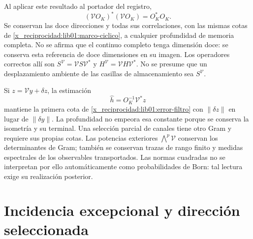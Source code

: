 Al aplicar este resultado al portador del registro,
\begin{equation}
 (\mathcal VO_K)^*(\mathcal VO_K)=O_K^*O_K.
 \label{x_reciprocidad:lib01:gram-memoria}
\end{equation}
Se conservan las doce direcciones y todas sus correlaciones, con las
mismas cotas de \cref{x_reciprocidad:lib01:marco-ciclico}, a cualquier profundidad de
memoria completa. No se afirma que el continuo completo tenga dimensión
doce: se conserva esta referencia de doce dimensiones en su imagen.
Los operadores correctos allí son
\(S^{\mathcal V}=\mathcal VS\mathcal V^*\) y
\(H^{\mathcal V}=\mathcal VH\mathcal V^*\). No se presume que un
desplazamiento ambiente de las casillas de almacenamiento sea
\(S^{\mathcal V}\).

Si \(z=\mathcal Vy+\delta z\), la estimación
\[
 \widehat h=O_K^{-1}\mathcal V^*z
\]
mantiene la primera cota de \eqref{x_reciprocidad:lib01:error-filtro} con
\(\|\delta z\|\) en lugar de \(\|\delta y\|\). La profundidad
no empeora esa constante porque se conserva la isometría y su terminal.
Una selección parcial de canales tiene otro Gram y requiere sus propias
cotas. Las potencias exteriores \(\bigwedge^p\mathcal V\) conservan
los determinantes de Gram; también se conservan trazas de rango finito y
medidas espectrales de los observables transportados. Las normas
cuadradas no se interpretan por ello automáticamente como probabilidades
de Born: tal lectura exige su realización posterior.

\section{Incidencia excepcional y dirección seleccionada}
\label{x_reciprocidad:lib01:direccion}

